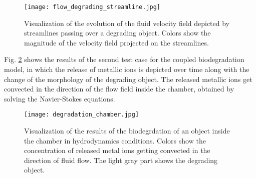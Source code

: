 \begin{figure}[h]
\centering
\medskip
\texttt{[image: flow\_degrading\_streamline.jpg]}
\caption[Fluid flow streamlines in the presence of a degrading object]{Visualization of the evolution of the fluid velocity field depicted by streamlines passing over a degrading object. Colors show the magnitude of the velocity field projected on the streamlines.} \label{fig:fluid_flow_degrading_streamline}
\end{figure}


Fig. \ref{fig:fluid_degradation_chamber} shows the results of the second test case for the coupled biodegradation model, in which the release of metallic ions is depicted over time along with the change of the morphology of the degrading object. The released metallic ions get convected in the direction of the flow field inside the chamber, obtained by solving the Navier-Stokes equations.


\begin{figure}[h]
\centering
\medskip
\texttt{[image: degradation\_chamber.jpg]}
\caption[Visualization of the biodegradation inside the chamber in presence of fluid flow]{Visualization of the results of the biodegrdation of an object inside the chamber in hydrodynamics conditions. Colors show the concentration of released metal ions getting convected in the direction of fluid flow. The light gray part shows the degrading object.} \label{fig:fluid_degradation_chamber}
\end{figure}














\cleardoublepage

